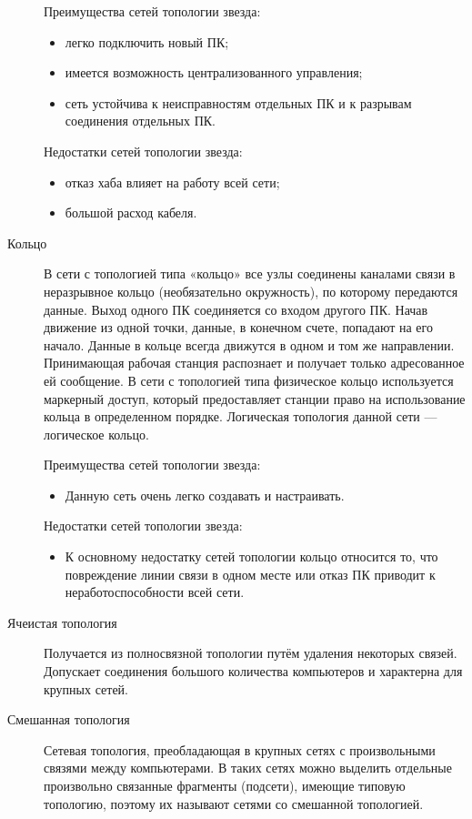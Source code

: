 \begin{description}
  Преимущества сетей топологии звезда:
  \begin{itemize}
  \item легко подключить новый ПК;
  \item имеется возможность централизованного управления;
  \item сеть устойчива к неисправностям отдельных ПК и к разрывам соединения отдельных ПК.
  \end{itemize}

  Недостатки сетей топологии звезда:
  \begin{itemize}
  \item отказ хаба влияет на работу всей сети;
  \item большой расход кабеля.
  \end{itemize}
  

\item[Кольцо]
  В сети с топологией типа «кольцо» все узлы соединены каналами связи в неразрывное кольцо (необязательно окружность), по которому передаются данные. Выход одного ПК соединяется со входом другого ПК. Начав движение из одной точки, данные, в конечном счете, попадают на его начало. Данные в кольце всегда движутся в одном и том же направлении.
  Принимающая рабочая станция распознает и получает только адресованное ей сообщение. В сети с топологией типа физическое кольцо используется маркерный доступ, который предоставляет станции право на использование кольца в определенном порядке. Логическая топология данной сети — логическое кольцо. 

  Преимущества сетей топологии звезда:
  \begin{itemize}
  \item Данную сеть очень легко создавать и настраивать.
  \end{itemize}

  Недостатки сетей топологии звезда:
  \begin{itemize}
  \item К основному недостатку сетей топологии кольцо относится то, что повреждение линии связи в одном месте или отказ ПК приводит к неработоспособности всей сети.
  \end{itemize}


\item[Ячеистая топология]
  Получается из полносвязной топологии путём удаления некоторых связей. Допускает соединения большого количества компьютеров и характерна для крупных сетей.

\item[Смешанная топология]
  Сетевая топология, преобладающая в крупных сетях с произвольными связями между компьютерами. В таких сетях можно выделить отдельные произвольно связанные фрагменты (подсети), имеющие типовую топологию, поэтому их называют сетями со смешанной топологией. 


\end{description}
